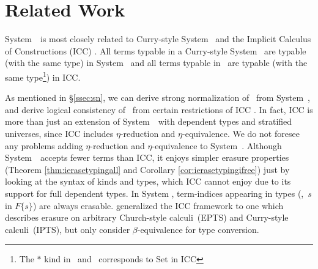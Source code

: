 \section{Related Work} \label{sec:relwork}
System~\Fi\ is most closely related to
Curry-style System~\Fw \cite{AbeMatUus05,GHR93}
and the Implicit Calculus of Constructions (ICC) \cite{Miquel01}.
All terms typable in a Curry-style System \Fw\ are typable (with the same type) in System \Fi\ 
and all terms typable in \Fi\ are typable (with the same type\footnote{The $*$ kind in \Fw\ and \Fi\ corresponds
        to \textsf{Set} in ICC}) in ICC.

As mentioned in \S\ref{ssec:sn}, we can derive strong normalization of \Fi\ 
from System~\Fw, and derive logical consistency of \Fi\ from certain
restrictions of ICC \cite{Miquel00,BarrasB08}.
In fact, ICC is more than just an extension of System~\Fi\ 
with dependent types and stratified universes, since ICC includes
$\eta$-reduction and $\eta$-equivalence.
We do not foresee any problems adding
$\eta$-reduction and $\eta$-equivalence to System~\Fi.
Although System~\Fi\ accepts fewer terms than ICC, it enjoys simpler
erasure properties (Theorem \ref{thm:ierasetypingall} and
Corollary \ref{cor:ierasetypingifree}) just by looking at the syntax
of kinds and types, which ICC cannot enjoy due to its support for
full dependent types.  In System \Fi, term-indices appearing in types
(\eg,~$s$ in $F\{s\}$) are always erasable.  \citet{LingerS08} generalized the ICC framework to one which describes
erasure on arbitrary Church-style calculi~(EPTS) and Curry-style
calculi~(IPTS), but only consider $\beta$-equivalence for type conversion.


